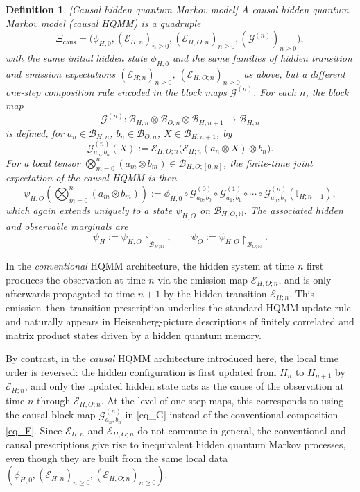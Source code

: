 \documentclass[11pt,a4paper]{article}
\newtheorem{definition}[theorem]{Definition}
\begin{document}
\begin{definition}\label{CHQMMs}[Causal hidden quantum Markov model]
A \emph{causal hidden quantum Markov model} (causal HQMM) is a quadruple
\[
\Xi_{\mathrm{caus}}
=
\bigl(\phi_{H,0},(\mathcal{E}_{H;n})_{n\ge 0},(\mathcal{E}_{H,O;n})_{n\ge 0},(\mathcal{G}^{(n)})_{n\ge 0}\bigr),
\]
with the same initial hidden state \(\phi_{H,0}\) and the same families of hidden transition and emission expectations \((\mathcal{E}_{H;n})_{n\ge 0}\), \((\mathcal{E}_{H,O;n})_{n\ge 0}\) as above, but a different one-step composition rule encoded in the block maps \(\mathcal{G}^{(n)}\). For each \(n\), the block map
\[
\mathcal{G}^{(n)}:\mathcal{B}_{H;n}\otimes\mathcal{B}_{O;n}\otimes\mathcal{B}_{H;n+1}\to\mathcal{B}_{H;n}
\]
is defined, for \(a_n\in\mathcal{B}_{H;n}\), \(b_n\in\mathcal{B}_{O;n}\), \(X\in\mathcal{B}_{H;n+1}\), by
\[
\mathcal{G}^{(n)}_{a_n,b_n}(X)
:=
\mathcal{E}_{H,O;n}\bigl(\mathcal{E}_{H;n}(a_n\otimes X)\otimes b_n\bigr).
\]
For a local tensor \(\bigotimes_{m=0}^n (a_m\otimes b_m)\in\mathcal{B}_{H,O;[0,n]}\), the finite-time joint expectation of the causal HQMM is then
\begin{equation}\label{eq:caus-state-no-sup}
\psi_{H,O}\!\left(\bigotimes_{m=0}^n (a_m\otimes b_m)\right)
:=
\phi_{H,0}\circ
\mathcal{G}^{(0)}_{a_0,b_0}\circ\mathcal{G}^{(1)}_{a_1,b_1}\circ\cdots\circ
\mathcal{G}^{(n)}_{a_n,b_n}(\mathbb{I}_{H;n+1}),
\end{equation}
which again extends uniquely to a state \(\psi_{H,O}\) on \(\mathcal{B}_{H,O;\mathbb{N}}\). The associated hidden and observable marginals are
\[
\psi_H
:=
\psi_{H,O}\!\restriction_{\mathcal{B}_{H;\mathbb{N}}},\qquad
\psi_O
:=
\psi_{H,O}\!\restriction_{\mathcal{B}_{O;\mathbb{N}}}.
\]
\end{definition}


In the \emph{conventional} HQMM architecture, the hidden system at time $n$
first produces the observation at time $n$ via the emission map $\mathcal{E}_{H,O;n}$,
and is only afterwards propagated to time $n+1$ by the hidden transition
$\mathcal{E}_{H;n}$.
This emission–then–transition prescription underlies the standard HQMM update
rule and naturally appears in Heisenberg-picture descriptions of finitely
correlated and matrix product states driven by a hidden quantum memory.


By contrast, in the \emph{causal} HQMM architecture introduced here, the local
time order is reversed: the hidden configuration is first updated from
$H_{n}$ to $H_{n+1}$ by $\mathcal{E}_{H;n}$, and only the updated hidden state
acts as the cause of the observation at time $n$ through $\mathcal{E}_{H,O;n}$.
At the level of one-step maps, this corresponds to using the causal block map
$\mathcal{G}_{a_{n},b_{n}}^{(n)}$ in \eqref{eq_G} instead of the conventional
composition \eqref{eq_F}.
Since $\mathcal{E}_{H;n}$ and $\mathcal{E}_{H,O;n}$ do not commute in general, the
conventional and causal prescriptions give rise to inequivalent hidden quantum
Markov processes, even though they are built from the same local data
$(\phi_{H,0},(\mathcal{E}_{H;n})_{n\ge 0},(\mathcal{E}_{H,O;n})_{n\ge 0})$.
\end{document}
